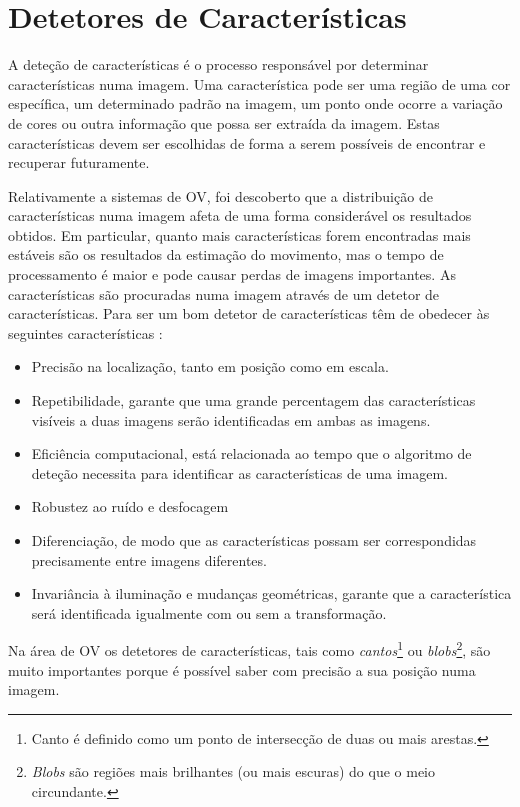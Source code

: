 \section{Detetores de Características}\label{detCar}

A deteção de características é o processo responsável por determinar características numa imagem. Uma característica pode ser uma região de uma cor específica, um determinado padrão na imagem, um ponto onde ocorre a variação de cores ou outra informação que possa ser extraída da imagem. Estas características devem ser escolhidas de forma a serem possíveis de encontrar e recuperar futuramente. 

Relativamente a sistemas de OV, foi descoberto que a distribuição de características numa imagem afeta de uma forma considerável os resultados obtidos. Em particular, quanto mais características forem encontradas mais estáveis são os resultados da estimação do movimento, mas o tempo de processamento é maior e pode causar perdas de imagens importantes. As características são procuradas numa imagem através de um detetor de características. Para ser um bom detetor de características têm de obedecer às seguintes características \cite{Fraundorfer2012}:
\begin{itemize}
	\item Precisão na localização, tanto em posição como em escala.
	\item Repetibilidade, garante que uma grande percentagem das características visíveis a duas imagens serão identificadas em ambas as imagens.
	\item Eficiência computacional, está relacionada ao tempo que o algoritmo de deteção necessita para identificar as características de uma imagem.
	\item Robustez ao ruído e desfocagem
	\item Diferenciação, de modo que as características possam ser correspondidas precisamente entre imagens diferentes.
	\item Invariância à iluminação e mudanças geométricas, garante que a característica será identificada igualmente com ou sem a transformação.
\end{itemize}

Na área de OV os detetores de características, tais como \textit{cantos}\footnote{Canto é definido como um ponto de intersecção de duas ou mais arestas.} ou \textit{blobs}\footnote{\textit{Blobs} são regiões mais brilhantes (ou mais escuras) do que o meio circundante.}, são muito importantes porque é possível saber com precisão a sua posição numa imagem. 


